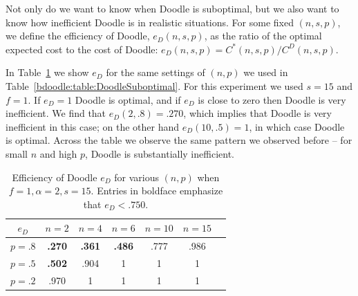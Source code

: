 Not only do we want to know when Doodle is suboptimal, but we also want to know how inefficient Doodle is in realistic situations. For some fixed $(n, s, p)$, we define the efficiency of Doodle, $e_{D}(n,s,p)$, as the ratio of the optimal expected cost to the cost of Doodle: $e_{D}(n,s,p) = C^*(n, s, p) / C^D(n, s, p)$. 

In Table~\ref{bdoodle:table:DoodleEfficiency} we show $e_{D}$ for the same settings of $(n, p)$ we used in Table~\ref{bdoodle:table:DoodleSuboptimal}. For this experiment we used $s = 15$ and $f = 1$. If $e_{D} = 1$ Doodle is optimal, and if $e_{D}$ is close to zero then Doodle is very inefficient. We find that $e_{D}(2, .8) = .270$, which implies that Doodle is very inefficient in this case; on the other hand $e_{D}(10, .5) = 1$, in which case Doodle is optimal. Across the table we observe the same pattern we observed before -- for small $n$ and high $p$, Doodle is substantially inefficient.
\begin{table}[h]  %
\centering
\begin{tabular}{|c|c|c|c|c|c|c|}
	\hline
	$e_{D}$ & $n = 2$ & $n = 4$ & $n = 6$ & $ n = 10 $ & $n = 15$ \\ \hline
	$p = .8$ & \textbf{.270} & \textbf{.361} & \textbf{.486} & .777 & .986 \\ \hline
	$p = .5$ & \textbf{.502} & .904 & 1 & 1 & 1  \\ \hline
	$p = .2$ & .970 & 1 & 1 & 1 & 1\\ \hline	
\end{tabular}
\caption{Efficiency of Doodle $e_{D}$ for various $(n, p)$ when $f = 1, \alpha=2, s = 15$.
Entries in boldface emphasize that $e_{D} < .750$.
} \label{bdoodle:table:DoodleEfficiency}
\end{table}

